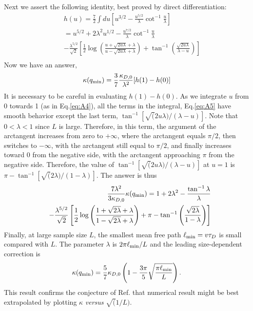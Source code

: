\documentclass[aps,prb,twocolumn,showpacs,superscriptaddress]{revtex4-1}\begin{tiny}\end{tiny}
\begin{document}
{\begin{appendix}
Next we assert the following identity, best proved by direct differentiation:
%
\begin{eqnarray}
&&h(u)=\frac{7}{2} \int du \left[ u^{3/2} - \frac{u^{5/2}}{\lambda} \cot^{-1}\frac{u}{\lambda}\right] \nonumber \\
&&=u^{5/2} + 2\lambda^2 u^{1/2} - \frac{u^{7/2}}{\lambda}\cot^{-1}\frac{u}{\lambda}
\nonumber \\
&&-\frac{\lambda^{5/2}}{\sqrt{2}}   \left[ \frac{1}{2}\log
\left( \frac{u+\sqrt{2u\lambda}+\lambda}{u-\sqrt{2u\lambda}+\lambda}\right)
+\tan^{-1}\left(\frac{\sqrt{2u\lambda}}{\lambda-u}\right) \right] \nonumber \\
\label{eq:A5}
\end{eqnarray}
%
Now we have an answer,
%
\begin{equation}
\kappa(q_{\rm min})=\frac{3}{7}\frac{\kappa_{D,0}}{\lambda^2} [h(1)-h(0)]
\label{eq:A6}
\end{equation}
%
It is necessary to be careful in evaluating $h(1)-h(0)$.  As we integrate $u$ from 0 towards 1
(as in Eq.\ref{eq:A4}), all the terms in the integral, Eq.\ref{eq:A5} have smooth behavior except
the last term, $\tan^{-1} [\sqrt(2u\lambda)/(\lambda-u)]$.  
Note that $0<\lambda<1$ since $L$ is large.   Therefore, in this term, the argument of the arctangent
increases from zero to $+\infty$, where the arctangent equals $\pi/2$, then switches to $-\infty$,
with the arctangent still equal to $\pi/2$, and finally increases toward $0$ from the negative side,
with the arctangent approaching $\pi$ from the negative side.
Therefore, the value of $\tan^{-1} [\sqrt(2u\lambda)/(\lambda-u)]$ at $u=1$ is $\pi - \tan^{-1}
[\sqrt(2\lambda)/(1-\lambda)]$.  The answer is thus
%
\begin{eqnarray}
&&\frac{7\lambda^2}{3\kappa_{D,0}}\kappa(q_{\rm min})=  
1 + 2\lambda^2  - \frac{\tan^{-1}\lambda}{\lambda} 
\nonumber \\
&&  -\frac{\lambda^{5/2}}{\sqrt{2}}   \left[ \frac{1}{2}\log
\left( \frac{1+\sqrt{2\lambda}+\lambda}{1-\sqrt{2\lambda}+\lambda}\right)
+\pi - \tan^{-1}\left(\frac{\sqrt{2\lambda}}{1-\lambda}\right) \right] \nonumber \\
\label{eq:A7}
\end{eqnarray}
%
Finally, at large sample size $L$,  the smallest mean free
path $\ell_{\rm min}=v\tau_D$ is small compared with $L$.
The parameter $\lambda$ is $2\pi\ell_{\rm min}/L$ and the leading
size-dependent correction is
%
\begin{equation}
\kappa(q_{\rm min})=\frac{5}{7}\kappa_{D,0}\left(1-\frac{3\pi}{5}\sqrt{\frac{\pi\ell_{\rm min}}{L}}\right).
\label{eq:A8}
\end{equation}
%
This result confirms the conjecture of Ref.  that numerical result might be best extrapolated
by plotting $\kappa$ {\it versus} $\sqrt(1/L)$.
%
%

\end{appendix}}
\end{document}
